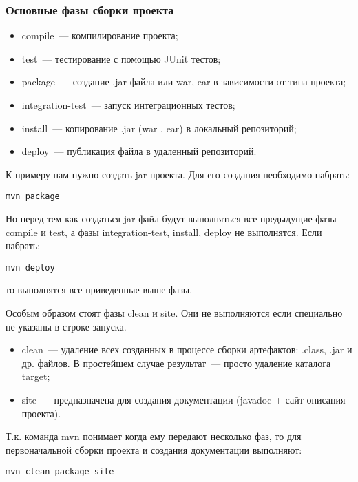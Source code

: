 \subsubsection{Основные фазы сборки проекта}
\begin{itemize}
\item compile~--- компилирование проекта;
\item test~--- тестирование с помощью JUnit тестов;
\item package~--- создание .jar файла или war, ear в зависимости от типа проекта;
\item integration-test~--- запуск интеграционных тестов;
\item install~--- копирование .jar (war , ear) в локальный репозиторий;
\item deploy~--- публикация файла в удаленный репозиторий.
\end{itemize}

К примеру нам нужно создать jar проекта. Для его создания необходимо набрать:
\begin{lstlisting}
mvn package
\end{lstlisting}

Но перед тем как создаться jar файл будут выполняться все предыдущие фазы compile и test, а фазы integration-test, install, deploy не выполнятся. Если набрать:

\begin{lstlisting}
mvn deploy
\end{lstlisting}

то выполнятся все приведенные выше фазы.

Особым образом стоят фазы clean и site. Они не выполняются если специально не указаны в строке запуска.

\begin{itemize}
\item clean~--- удаление всех созданных в процессе сборки артефактов: .class, .jar и др. файлов. В простейшем случае результат~--- просто удаление каталога target;
\item site~--- предназначена для создания документации (javadoc + сайт описания проекта).
\end{itemize}

Т.к. команда mvn понимает когда ему передают несколько фаз, то для первоначальной сборки проекта и создания документации выполняют:

\begin{lstlisting}
mvn clean package site
\end{lstlisting}

